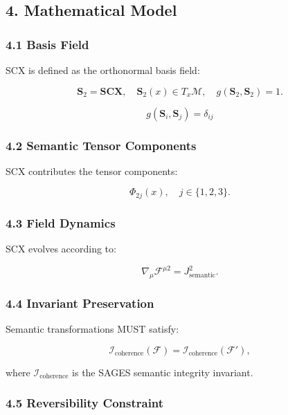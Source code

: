 \subsection{4. Mathematical Model}\label{mathematical-model}

\subsubsection{4.1 Basis Field}\label{basis-field}

SCX is defined as the orthonormal basis field:

\[
\mathbf{S}_2 = \mathbf{SCX},\quad \mathbf{S}_2(x) \in T_x\mathcal{M}, \quad g(\mathbf{S}_2, \mathbf{S}_2) = 1.
\]

\[
g(\mathbf{S}_i,\mathbf{S}_j)=\delta_{ij}
\]

\subsubsection{4.2 Semantic Tensor Components}\label{semantic-tensor-components}

SCX contributes the tensor components:

\[
\Phi_{2j}(x), \quad j \in \{1,2,3\}.
\]

\subsubsection{4.3 Field Dynamics}\label{field-dynamics}

SCX evolves according to:

\[
\nabla_{\mu} \mathcal{F}^{\mu 2} = J^{2}_{\mathrm{semantic}}.
\]

\subsubsection{4.4 Invariant Preservation}\label{invariant-preservation}

Semantic transformations MUST satisfy:

\[
\mathcal{I}_{\mathrm{coherence}}(\mathcal{F}) = \mathcal{I}_{\mathrm{coherence}}(\mathcal{F}'),
\]

where \(\mathcal{I}_{\mathrm{coherence}}\) is the SAGES semantic integrity invariant.

\subsubsection{4.5 Reversibility Constraint}\label{reversibility-constraint}

